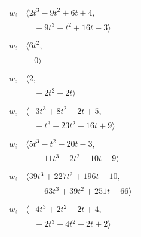 \documentclass[11pt]{article}
\begin{document}
\begin{longtable}{@{}ll@{}}
$w_i$ & $\langle 2t^{3}-9t^{2}+6t+4,$\\
 & $\quad -9t^{3}-t^{2}+16t-3\rangle$\\
\addlinespace[2pt]
\multicolumn{2}{@{}p{0.97\textwidth}@{}}{$i=17$, $D_i=2$, $\rho_{ij}$: $3{:}1, \allowbreak 5{:}1, \allowbreak 16{:}1, \allowbreak 30{:}1, \allowbreak 31{:}2, \allowbreak 37{:}1, \allowbreak 39{:}1$}\\
$w_i$ & $\langle 6t^{2},$\\
 & $\quad 0\rangle$\\
\addlinespace[2pt]
\multicolumn{2}{@{}p{0.97\textwidth}@{}}{$i=18$, $D_i=2$, $\rho_{ij}$: $3{:}1, \allowbreak 10{:}2, \allowbreak 33{:}2, \allowbreak 37{:}2$}\\
$w_i$ & $\langle 2,$\\
 & $\quad -2t^{2}-2t\rangle$\\
\addlinespace[2pt]
\multicolumn{2}{@{}p{0.97\textwidth}@{}}{$i=19$, $D_i=4$, $\rho_{ij}$: $13{:}1, \allowbreak 15{:}2, \allowbreak 21{:}2, \allowbreak 27{:}2, \allowbreak 31{:}2, \allowbreak 35{:}2, \allowbreak 37{:}1, \allowbreak 39{:}2$}\\
$w_i$ & $\langle -3t^{3}+8t^{2}+2t+5,$\\
 & $\quad -t^{3}+23t^{2}-16t+9\rangle$\\
\addlinespace[2pt]
\multicolumn{2}{@{}p{0.97\textwidth}@{}}{$i=20$, $D_i=4$, $\rho_{ij}$: $5{:}1, \allowbreak 8{:}2, \allowbreak 21{:}2, \allowbreak 30{:}1, \allowbreak 33{:}2, \allowbreak 34{:}2, \allowbreak 35{:}2, \allowbreak 37{:}2$}\\
$w_i$ & $\langle 5t^{3}-t^{2}-20t-3,$\\
 & $\quad -11t^{3}-2t^{2}-10t-9\rangle$\\
\addlinespace[2pt]
\multicolumn{2}{@{}p{0.97\textwidth}@{}}{$i=21$, $D_i=8$, $\rho_{ij}$: $0{:}2, \allowbreak 5{:}2, \allowbreak 8{:}1, \allowbreak 11{:}2, \allowbreak 19{:}1, \allowbreak 20{:}1, \allowbreak 27{:}2, \allowbreak 35{:}2, \allowbreak 39{:}2$}\\
$w_i$ & $\langle 39t^{3}+227t^{2}+196t-10,$\\
 & $\quad -63t^{3}+39t^{2}+251t+66\rangle$\\
\addlinespace[2pt]
\multicolumn{2}{@{}p{0.97\textwidth}@{}}{$i=22$, $D_i=1$, $\rho_{ij}$: $1{:}2, \allowbreak 9{:}1, \allowbreak 23{:}2, \allowbreak 25{:}1, \allowbreak 26{:}2, \allowbreak 31{:}1, \allowbreak 32{:}1$}\\
$w_i$ & $\langle -4t^{3}+2t^{2}-2t+4,$\\
 & $\quad -2t^{3}+4t^{2}+2t+2\rangle$\\

\end{longtable}
\end{document}
